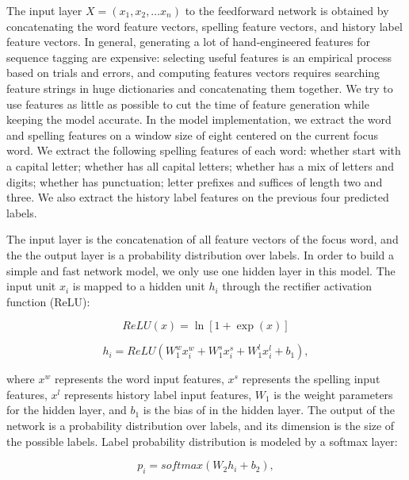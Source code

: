 \documentclass{sfuthesis}
\begin{document}
The input layer $X=\left( x_{1},x_{2},\ldots x_{n}\right)$ to the feedforward network is obtained by concatenating the word feature vectors, spelling feature vectors, and history label feature vectors. In general, generating a lot of hand-engineered features for sequence tagging are expensive: selecting useful features is an empirical process based on trials and errors, and computing features vectors requires searching feature strings in huge dictionaries and concatenating them together. We try to use features as little as possible to cut the time of feature generation while keeping the model accurate. In the model implementation, we extract the word and spelling features on a window size of eight centered on the current focus word. We extract the following spelling features of each word: whether start with a capital letter; whether has all capital letters; whether has a mix of letters and digits; whether has punctuation; letter prefixes and suffices of length two and three. We also extract the history label features on the previous four predicted labels. 

The input layer is the concatenation of all feature vectors of the focus word, and the the output layer is a probability distribution over labels. In order to build a simple and fast network model, we only use one hidden layer in this model. The input unit $x_{i}$ is mapped to a hidden unit $h_{i}$ through the rectifier activation function (ReLU):

\begin{equation}
ReLU\left(x\right) = \ln\left[1+\exp\left(x\right)\right]
\end{equation}

\begin{equation}
h_{i}=ReLU\left( W_{1}^{w}x_{i}^{w}+W_{1}^{s}x_{i}^{s}+W_{1}^{l}x_{i}^{l}+b_{1}\right),
\end{equation}

where $x^{w}$ represents the word input features, $x^{s}$ represents the spelling input features, $x^{l}$ represents history label input features, $W_{1}$ is the weight parameters for the hidden layer, and $b_{1}$ is the bias of in the hidden layer. The output of the network is a probability distribution over labels, and its dimension is the size of the possible labels. Label probability distribution is modeled by a softmax layer:

\begin{equation}
p_{i}=softmax\left(W_{2}h_{i}+b_{2}\right),
\end{equation}
\end{document}
